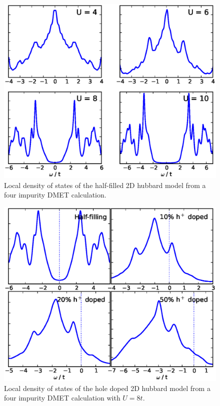 \documentclass[aps,showpacs,twocolumn,nobibnotes]{revtex4}
\begin{document}
\begin{figure}
\begin{center}
\includegraphics[scale=0.475]{Plots/2D_Spectra/2DHub_Spectra.eps}
\end{center}
\caption{Local density of states of the half-filled 2D hubbard model from a four impurity DMET calculation.}
\label{2D_DOS}
\end{figure}


\begin{figure}
\begin{center}
\includegraphics[scale=0.475]{Plots/Doping/2D/nImp4/U8/LargerBroadening/2DHub_Doping.eps}
\end{center}
\caption{Local density of states of the hole doped 2D hubbard model from a four impurity DMET calculation with $U = 8t$.}
\label{2D_Doped}
\end{figure}
\end{document}
